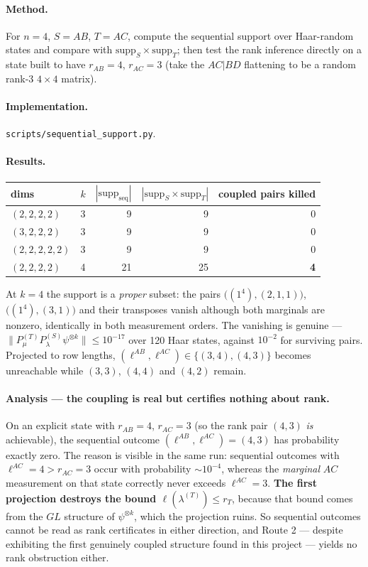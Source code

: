 \documentclass[11pt]{article}
\theoremstyle{definition}
\theoremstyle{remark}
\begin{document}
\paragraph{Method.} For $n = 4$, $S = AB$, $T = AC$, compute the sequential support over
Haar-random states and compare with $\mathrm{supp}_S \times \mathrm{supp}_T$; then test
the rank inference directly on a state built to have $r_{AB} = 4$, $r_{AC} = 3$ (take the
$AC|BD$ flattening to be a random rank-3 $4\times4$ matrix).

\paragraph{Implementation.} \texttt{scripts/sequential\_support.py}.

\paragraph{Results.}
{
\setlength{\tabcolsep}{8pt}
\renewcommand{\arraystretch}{1.2}
\begin{tabular}{llrrr}
\toprule
dims & $k$ & $|\mathrm{supp}_{\text{seq}}|$ & $|\mathrm{supp}_S \times \mathrm{supp}_T|$ & coupled pairs killed \\
\midrule
$(2,2,2,2)$   & 3 & 9  & 9  & 0 \\
$(3,2,2,2)$   & 3 & 9  & 9  & 0 \\
$(2,2,2,2,2)$ & 3 & 9  & 9  & 0 \\
$(2,2,2,2)$   & 4 & 21 & 25 & \textbf{4} \\
\bottomrule
\end{tabular}
}

\medskip
\noindent At $k=4$ the support is a \emph{proper} subset: the pairs
$\bigl((1^4),(2,1,1)\bigr)$, $\bigl((1^4),(3,1)\bigr)$ and their transposes vanish
although both marginals are nonzero, identically in both measurement orders. The
vanishing is genuine --- $\|P^{(T)}_\mu P^{(S)}_\lambda \psi^{\otimes k}\| \le 10^{-17}$
over 120 Haar states, against $10^{-2}$ for surviving pairs. Projected to row lengths,
$(\ell^{AB},\ell^{AC}) \in \{(3,4),(4,3)\}$ becomes unreachable while $(3,3)$, $(4,4)$
and $(4,2)$ remain.

\paragraph{Analysis --- the coupling is real but certifies nothing about rank.}
On an explicit state with $r_{AB} = 4$, $r_{AC} = 3$ (so the rank pair $(4,3)$ \emph{is}
achievable), the sequential outcome $(\ell^{AB},\ell^{AC}) = (4,3)$ has probability
exactly zero. The reason is visible in the same run: sequential outcomes with
$\ell^{AC} = 4 > r_{AC} = 3$ occur with probability $\sim 10^{-4}$, whereas the
\emph{marginal} $AC$ measurement on that state correctly never exceeds
$\ell^{AC} = 3$. \textbf{The first projection destroys the bound
$\ell(\lambda^{(T)}) \le r_T$}, because that bound comes from the $GL$ structure of
$\psi^{\otimes k}$, which the projection ruins. So sequential outcomes cannot be read as
rank certificates in either direction, and Route 2 --- despite exhibiting the first
genuinely coupled structure found in this project --- yields no rank obstruction either.
\end{document}
